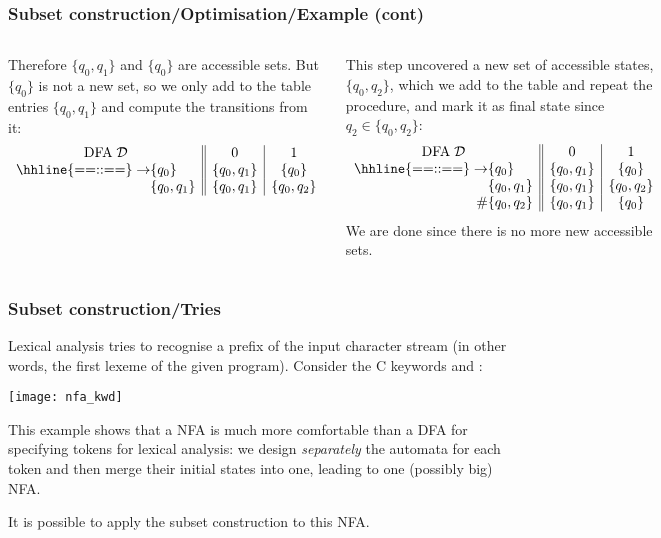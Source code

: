 % 
\begin{frame}
\frametitle{Subset construction/Optimisation/Example (cont)}

\begin{columns}

   Therefore \(\{q_0,q_1\}\) and \(\{q_0\}\) are
  accessible sets. But \(\{q_0\}\) is not a new set, so we only add to
  the table entries \(\{q_0, q_1\}\) and compute the transitions from
  it:
  \[
  \begin{array}{r@{}l||c|c}
    \multicolumn{2}{c||}{\text{DFA} \; {\cal D}} & 0 & 1\\
    \hhline{==::==}
    \rightarrow & \{q_0\}      & \{q_0, q_1\} & \{q_0\}\\
                & \{q_0, q_1\} & \{q_0, q_1\} & \{q_0, q_2\}
  \end{array}
  \]

  This step uncovered a new set of accessible states, \(\{q_0,
  q_2\}\), which we add to the table and repeat the procedure, and
  mark it as final state since \(q_2 \in \{q_0, q_2\}\):
  \[
  \begin{array}{r@{}l||c|c}
    \multicolumn{2}{c||}{\text{DFA} \; {\cal D}} & 0 & 1\\
    \hhline{==::==}
    \rightarrow & \{q_0\}      & \{q_0, q_1\} & \{q_0\}\\
                & \{q_0, q_1\} & \{q_0, q_1\} & \{q_0, q_2\}\\
             \# & \{q_0, q_2\} & \{q_0, q_1\} & \{q_0\}
  \end{array}
  \]
  We are done since there is no more new accessible sets.
\end{columns}

\end{frame}

% 
\begin{frame}
\frametitle{Subset construction/Tries}

Lexical analysis tries to recognise a prefix of the input character
stream (in other words, the first lexeme of the given
program). Consider the C keywords  and :
\begin{center}
\texttt{[image: nfa\_kwd]}
\end{center}
This example shows that a NFA is much more comfortable than a DFA for
specifying tokens for lexical analysis: we design \emph{separately}
the automata for each token and then merge their initial states into
one, leading to one (possibly big) NFA.

\bigskip

It is possible to apply the subset construction to this NFA.

\end{frame}

